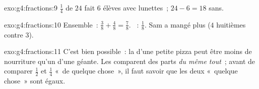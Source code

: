 \begin{solution}{exo:g4:fractions:9}
$\frac14$ de $24$ fait $6$ élèves avec lunettes~; $24 - 6 = 18$
sans.
\end{solution}

\begin{solution}{exo:g4:fractions:10}
Ensemble~: $\frac38 + \frac48 = \frac78$. ~: $\frac18$. Sam a
mangé plus ($4$ huitièmes contre $3$).
\end{solution}

\begin{solution}{exo:g4:fractions:11}
C'est bien possible~: la  d'une petite pizza peut être moins
de nourriture qu'un  d'une géante. Les  comparent des
parts \emph{du même tout}~; avant de comparer $\frac12$ et
$\frac14$ «~de quelque chose~», il faut savoir que les deux
«~quelque chose~» sont égaux.
\end{solution}
